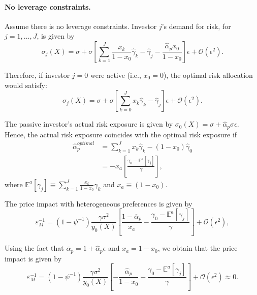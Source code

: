 \paragraph{No leverage constraints.} Assume there is no leverage constraints. Investor $j$'s demand for risk, for $j = 1,\ldots, J$, is given by 
\begin{equation}
    \sigma_j(X) = \sigma + \sigma \left[  \sum_{k=1}^J \frac{x_k}{1-x_0} \hat{\gamma}_k - \hat{\gamma}_j  - \frac{\hat{\alpha}_p x_0}{1-x_0}\right] \epsilon + \mathcal{O}(\epsilon^2).
\end{equation}

Therefore, if investor $j = 0$ were active (i.e., $x_0=0$), the optimal risk allocation would satisfy:
\begin{equation}
    \sigma_j(X) = \sigma + \sigma \left[  \sum_{k=0}^J x_k \hat{\gamma}_k - \hat{\gamma}_j  \right] \epsilon + \mathcal{O}(\epsilon^2).
\end{equation}

The passive investor's actual risk exposure is given by $\sigma_0(X) = \sigma + \hat{\alpha}_p \sigma \epsilon$. Hence, the actual risk exposure coincides with the optimal risk exposure if
\begin{align}
    \hat{\alpha}_p^{optimal} &=  \sum_{k=1}^J x_k \hat{\gamma}_k - (1-x_0) \hat{\gamma}_0 \\
    &= - x_a \left[ \frac{\gamma_0 - \mathbb{E}^a[\gamma_j]}{\gamma} \right],
\end{align}
where $\mathbb{E}^a[\gamma_j] \equiv \sum_{k=1}^J \frac{x_k}{1-x_0} \gamma_k$ and $x_a\equiv(1-x_0)$.

The price impact with heterogeneous preferences is given by
\begin{equation}
	\varepsilon_M^{-1}=\left(1-\psi^{-1}\right) \frac{\gamma \sigma^{2}}{y_{0}(X)}\left[\frac{1-\overline{\alpha}_{p}}{x_{a}}-\frac{\gamma_{0}-\mathbb{E}^{a}[\gamma_{j}]}{\gamma}\right]+\mathcal{O}\left(\epsilon^{2}\right),
\end{equation}

Using the fact that $\overline{\alpha}_p = 1 + \hat{\alpha}_p \epsilon$ and $x_a = 1-x_0$, we obtain that the price impact is given by
\begin{equation}
	\varepsilon_M^{-1}=\left(1-\psi^{-1}\right) \frac{\gamma \sigma^{2}}{y_{0}(X)}\left[-\frac{\hat{\alpha}_{p}}{1-x_0}-\frac{\gamma_{0}-\mathbb{E}^{a
 }[\gamma_{j}]}{\gamma}\right]+\mathcal{O}\left(\epsilon^{2}\right) \approx 0.
\end{equation}

